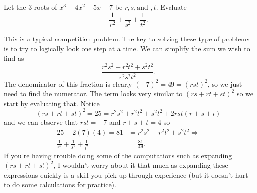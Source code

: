 \documentclass[11pt]{article}
\begin{document}
 \begin{example}
    Let the 3 roots of $x^3-4x^2+5x-7$ be $r, s, \text{and }, t$. Evaluate
    \[
    \frac{1}{r^2} + \frac{1}{s^2} + \frac{1}{t^2}.
    \]
 \end{example}
 This is a typical competition problem. The key to solving these type of problems is to try to logically look one step at a time. We can simplify the sum we wish to find as 
 \[
 \frac{r^2s^2 + r^2t^2 + s^2t^2}{r^2s^2t^2}.
 \]
 The denominator of this fraction is clearly $(-7)^2=49=(rst)^2$, so we just need to find the numerator. The term looks very similar to $(rs+rt+st)^2$ so we start by evaluating that. Notice
 \[
 (rs+rt+st)^2= 25 = r^2s^2+r^2t^2+s^2t^2 + 2rst(r+s+t)
 \] and we can observe that $rst=-7$ and $r+s+t = 4$ so
 \begin{equation*}
    \begin{aligned}
        25 + 2(7)(4) = 81   & = r^2s^2 + r^2t^2 + s^2t^2 \Longrightarrow \\
        \frac{1}{r^2}+\frac{1}{s^2}+\frac{1}{t^2} & =\frac{81}{49}.
    \end{aligned}
 \end{equation*}
 If you're having trouble doing some of the computations such as expanding $(rs+rt+st)^2$, I wouldn't worry about it that much as expanding these expressions quickly is a skill you pick up through experience (but it doesn't hurt to do some calculations for practice).
\end{document}
